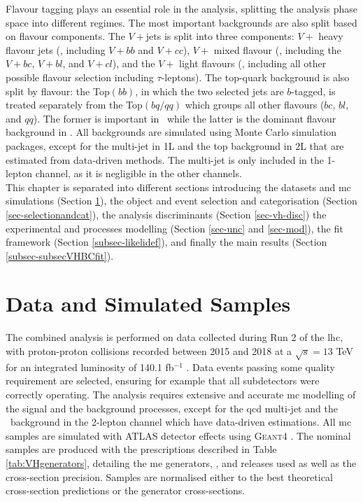 Flavour tagging plays an essential role in the analysis, splitting the analysis phase space into different regimes. The most important backgrounds are also split based on flavour components. The $V+$jets is split into three components: $V+$ heavy flavour jets (\vhf, including $V+bb$ and $V+cc$), $V+$ mixed flavour (\vmf, including the $V+bc$, $V+bl$, and $V+cl$), and the $V+$ light flavours (\vlf, including all other possible flavour selection including $\tau$-leptons). The top-quark background is also split by flavour: the Top$(bb)$, in which the two selected jets are $b$-tagged, is treated separately from the Top$(bq/qq)$ which groups all other flavours ($bc$, $bl$, and $qq$). The former is important in \vhb\ while the latter is the dominant flavour background in \vhc. All backgrounds are simulated using Monte Carlo simulation packages, except for the multi-jet in 1L and the top background in 2L that are estimated from data-driven methods. The multi-jet is only included in the 1-lepton channel, as it is negligible in the other channels. \\

This chapter is separated into different sections introducing the datasets and \gls{mc} simulations (Section \ref{sec-datasets}), the object and event selection and categorisation (Section \ref{sec-selectionandcat}), the analysis discriminants (Section \ref{sec-vh-disc}) the experimental and processes modelling (Section \ref{sec-unc} and \ref{sec-mod}), the fit framework (Section \ref{subsec-likelidef}), and finally the main results (Section \ref{subsec-subsecVHBCfit}).

\section{Data and Simulated Samples}\label{sec-datasets} 
The combined analysis is performed on data collected during Run 2 of the \gls{lhc}, with proton-proton collisions recorded between 2015 and 2018 at a $\sqrt{s} = 13$ TeV for an integrated luminosity of 140.1 fb$^{-1}$ \cite{ATLAS:2022hro}. Data events passing some quality requirement are selected, ensuring for example that all subdetectors were correctly operating. The analysis requires extensive and accurate \gls{mc} modelling of the signal and the background processes, except for the \gls{qcd} multi-jet and the \ttb\ background in the 2-lepton channel which have data-driven estimations. All \gls{mc} samples are simulated with ATLAS detector effects \cite{ATLASSimulationInfra} using \textsc{Geant4} \cite{Agostinelli:602040}. The nominal samples are produced with the prescriptions described in Table \ref{tab:VHgenerators}, detailing the \gls{me} generators, , and  releases used as well as the cross-section precision. Samples are normalised either to the best theoretical cross-section predictions or the generator cross-sections. \\

